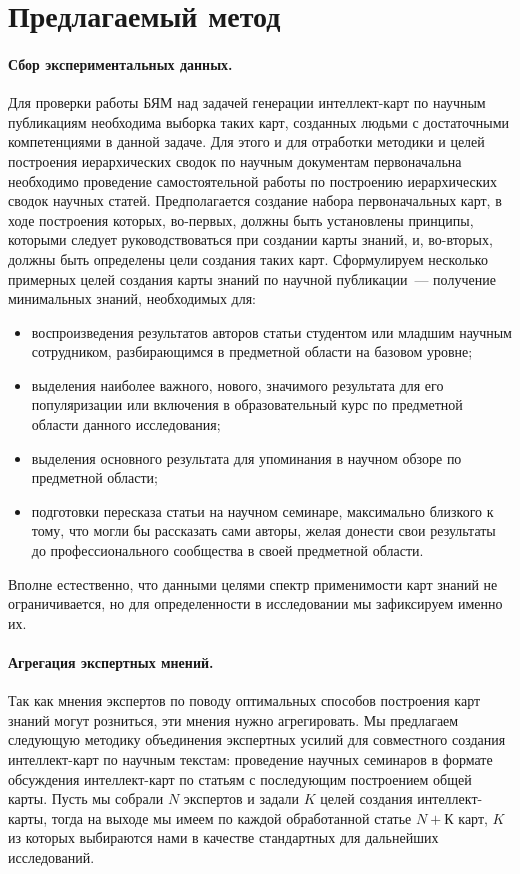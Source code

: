 \documentclass[12pt]{article}
\begin{document}
\newpage
\section{Предлагаемый метод}

\paragraph{Сбор экспериментальных данных.} Для проверки работы БЯМ над задачей генерации интеллект-карт по научным публикациям необходима выборка таких карт, созданных людьми с достаточными компетенциями в данной задаче. Для этого и для отработки методики и целей построения иерархических сводок по научным документам первоначальна необходимо проведение самостоятельной работы по построению иерархических сводок научных статей. Предполагается создание набора первоначальных карт, в ходе построения которых, во-первых, должны быть установлены принципы, которыми следует руководствоваться при создании карты знаний, и, во-вторых, должны быть определены цели создания таких карт. Сформулируем несколько примерных целей создания карты знаний по научной публикации~--- получение минимальных знаний, необходимых для:
\begin{itemize}
\item воспроизведения результатов авторов статьи студентом или младшим научным сотрудником, разбирающимся в предметной области на базовом уровне;
\item выделения наиболее важного, нового, значимого результата для его популяризации или включения в образовательный курс по предметной области данного исследования;
\item выделения основного результата для упоминания в научном обзоре по предметной области;
\item подготовки пересказа статьи на научном семинаре, максимально близкого к тому, что могли бы рассказать сами авторы, желая донести свои результаты до профессионального сообщества в своей предметной области. 
\end{itemize}
Вполне естественно, что данными целями спектр применимости карт знаний не ограничивается, но для определенности в исследовании мы зафиксируем именно их.

\paragraph{Агрегация экспертных мнений.} Так как мнения экспертов по поводу оптимальных способов построения карт знаний могут розниться, эти мнения нужно агрегировать. Мы предлагаем следующую методику объединения экспертных усилий для совместного создания интеллект-карт по научным текстам: проведение научных семинаров в формате обсуждения интеллект-карт по статьям с последующим построением общей карты. Пусть мы собрали $N$ экспертов и задали $K$ целей создания интеллект-карты, тогда на выходе мы имеем по каждой обработанной статье $N+К$ карт, $K$ из которых выбираются нами в качестве стандартных для дальнейших исследований.
\end{document}

